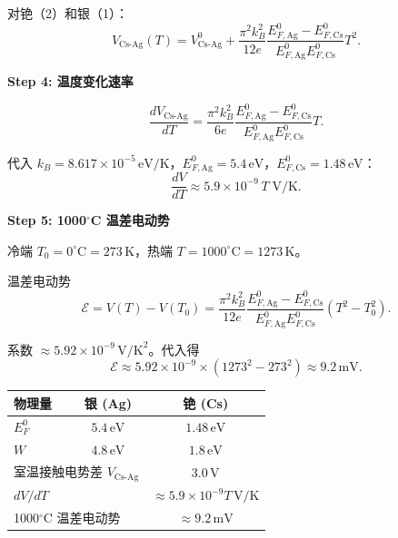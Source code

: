 \begin{derivationbox}[标准解题过程]
对铯（2）和银（1）：
\begin{equation}
V_{\text{Cs-Ag}}(T)=V_{\text{Cs-Ag}}^0+\frac{\pi^2k_B^2}{12e}\frac{E_{F,\text{Ag}}^0-E_{F,\text{Cs}}^0}{E_{F,\text{Ag}}^0E_{F,\text{Cs}}^0}T^2.
\end{equation}

\textbf{Step 4: 温度变化速率}

\begin{equation}
\frac{dV_{\text{Cs-Ag}}}{dT}=\frac{\pi^2k_B^2}{6e}\frac{E_{F,\text{Ag}}^0-E_{F,\text{Cs}}^0}{E_{F,\text{Ag}}^0E_{F,\text{Cs}}^0}T.
\end{equation}

代入 $k_B=8.617\times10^{-5}\,\text{eV/K}$，$E_{F,\text{Ag}}^0=5.4\,\text{eV}$，$E_{F,\text{Cs}}^0=1.48\,\text{eV}$：
\begin{equation}
\boxed{\frac{dV}{dT}\approx5.9\times10^{-9}\,T\;\text{V/K}.}
\end{equation}

\textbf{Step 5: 1000$^\circ$C 温差电动势}

冷端 $T_0=0^\circ\text{C}=273\,\text{K}$，热端 $T=1000^\circ\text{C}=1273\,\text{K}$。

温差电动势
\begin{equation}
\mathcal{E}=V(T)-V(T_0)=\frac{\pi^2k_B^2}{12e}\frac{E_{F,\text{Ag}}^0-E_{F,\text{Cs}}^0}{E_{F,\text{Ag}}^0E_{F,\text{Cs}}^0}(T^2-T_0^2).
\end{equation}

系数 $\approx5.92\times10^{-9}\,\text{V/K}^2$。代入得
\begin{equation}
\boxed{\mathcal{E}\approx5.92\times10^{-9}\times(1273^2-273^2)\approx9.2\,\text{mV}.}
\end{equation}
\end{derivationbox}

\begin{formulabox}[答案汇总]
\begin{center}
\begin{tabular}{lcc}
\toprule
\textbf{物理量} & \textbf{银 (Ag)} & \textbf{铯 (Cs)} \\
\midrule
$E_F^0$ & $5.4\,\text{eV}$ & $1.48\,\text{eV}$ \\
$W$ & $4.8\,\text{eV}$ & $1.8\,\text{eV}$ \\
\midrule
\multicolumn{2}{l}{室温接触电势差 $V_{\text{Cs-Ag}}$} & $3.0\,\text{V}$ \\
\multicolumn{2}{l}{$dV/dT$} & $\approx5.9\times10^{-9}T\,\text{V/K}$ \\
\multicolumn{2}{l}{1000$^\circ$C 温差电动势} & $\approx9.2\,\text{mV}$ \\
\bottomrule
\end{tabular}
\end{center}
\end{formulabox}

